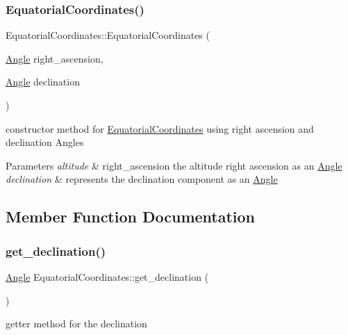 \subsubsection{\texorpdfstring{Equatorial\+Coordinates()}{EquatorialCoordinates()}}
{\footnotesize\ttfamily Equatorial\+Coordinates\+::\+Equatorial\+Coordinates (\begin{DoxyParamCaption}\item[{\mbox{\hyperlink{classAngle}{Angle}}}]{right\+\_\+ascension,  }\item[{\mbox{\hyperlink{classAngle}{Angle}}}]{declination }\end{DoxyParamCaption})}



constructor method for \mbox{\hyperlink{classEquatorialCoordinates}{Equatorial\+Coordinates}} using right ascension and declination Angles 


\begin{DoxyParams}{Parameters}
{\em altitude} & right\+\_\+ascension the altitude right ascension as an \mbox{\hyperlink{classAngle}{Angle}} \\
\hline
{\em declination} & represents the declination component as an \mbox{\hyperlink{classAngle}{Angle}} \\
\hline
\end{DoxyParams}


\subsection{Member Function Documentation}
\mbox{\label{classEquatorialCoordinates_abdfc3d2ece63332b9a6a2267ae886710}} 
\subsubsection{\texorpdfstring{get\+\_\+declination()}{get\_declination()}}
{\footnotesize\ttfamily \mbox{\hyperlink{classAngle}{Angle}} Equatorial\+Coordinates\+::get\+\_\+declination (\begin{DoxyParamCaption}{ }\end{DoxyParamCaption})}



getter method for the declination 

